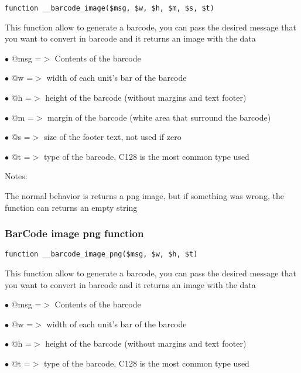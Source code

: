 \documentclass[a4paper]{article}
\begin{document}
\begin{lstlisting}
function __barcode_image($msg, $w, $h, $m, $s, $t)
\end{lstlisting}

This function allow to generate a barcode, you can pass the desired
message that you want to convert in barcode and it returns an image
with the data

\begin{compactitem}
\item[\color{myblue}$\bullet$] @msg =$>$ Contents of the barcode
\item[\color{myblue}$\bullet$] @w   =$>$ width of each unit's bar of the barcode
\item[\color{myblue}$\bullet$] @h   =$>$ height of the barcode (without margins and text footer)
\item[\color{myblue}$\bullet$] @m   =$>$ margin of the barcode (white area that surround the barcode)
\item[\color{myblue}$\bullet$] @s   =$>$ size of the footer text, not used if zero
\item[\color{myblue}$\bullet$] @t   =$>$ type of the barcode, C128 is the most common type used
\end{compactitem}

Notes:

The normal behavior is returns a png image, but if something was wrong,
the function can returns an empty string

\hypertarget{toc386}{}
\subsubsection{BarCode image png function}

\begin{lstlisting}
function __barcode_image_png($msg, $w, $h, $t)
\end{lstlisting}

This function allow to generate a barcode, you can pass the desired
message that you want to convert in barcode and it returns an image
with the data

\begin{compactitem}
\item[\color{myblue}$\bullet$] @msg =$>$ Contents of the barcode
\item[\color{myblue}$\bullet$] @w   =$>$ width of each unit's bar of the barcode
\item[\color{myblue}$\bullet$] @h   =$>$ height of the barcode (without margins and text footer)
\item[\color{myblue}$\bullet$] @t   =$>$ type of the barcode, C128 is the most common type used
\end{compactitem}
\end{document}
